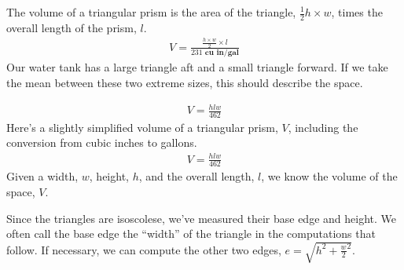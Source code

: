 \documentclass[letterpaper,10pt,english]{sphinxmanual}
\begin{document}
\sphinxAtStartPar
The volume of a triangular prism is the area of the triangle, \(\frac{1}{2} h \times w\), times the overall length of the prism, \(l\).
\begin{equation*}
\begin{split}
V = \frac{\frac{h \times w}{2} \times l}{231 \textbf{ cu in/gal}}
\end{split}
\end{equation*}
\sphinxAtStartPar
Our water tank has a large triangle aft and a small triangle forward. If we take the mean between these two extreme sizes, this should describe the space.

\begin{sphinxVerbatim}[commandchars=\\\{\}]
   
\end{sphinxVerbatim}

\begin{sphinxVerbatim}[commandchars=\\\{\}]
   
     
           
\end{sphinxVerbatim}
\begin{equation*}
\begin{split}\displaystyle V = \frac{h l w}{462}\end{split}
\end{equation*}
\sphinxAtStartPar
Here’s a slightly simplified volume of a triangular prism, \(V\), including the conversion from cubic inches to gallons.
\begin{equation}\label{equation:index:prism}
\begin{split}\displaystyle V = \frac{h l w}{462}\end{split}
\end{equation}
\sphinxAtStartPar
Given a width, \(w\), height, \(h\), and the overall length, \(l\), we know the volume of the space, \(V\).

\sphinxAtStartPar
Since the triangles are isoscolese, we’ve measured their base edge and height. We often call the base edge the “width” of the triangle in the computations that follow.
If necessary, we can compute the other two edges, \(e = \sqrt{h^2+{\frac{w}{2}}^2}\).
\end{document}
